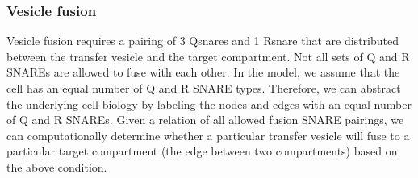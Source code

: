 
\subsubsection{Vesicle fusion}
%
% 
%
%  
%
%
Vesicle fusion requires a pairing of 3 Qsnares and 1 Rsnare that are distributed between the transfer vesicle and the target compartment. 
%
%
Not all sets of Q and R SNAREs are allowed to fuse with each other.
%
In the model, we assume that the cell has an equal number of Q and R SNARE types.
%
Therefore, we can abstract the underlying cell biology by labeling the nodes and edges with an equal number of Q and R SNAREs. 
%
%
Given a relation of all allowed fusion SNARE pairings, we can computationally determine whether a particular transfer vesicle will fuse to a particular target compartment (the edge between two compartments) based on the above condition.  

